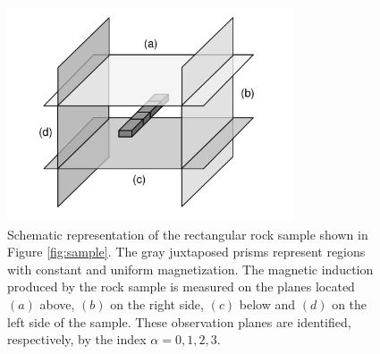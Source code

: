 \documentclass[draft,gc]{agutex}
\begin{document}
 \begin{figure}
 \noindent \includegraphics[width=20pc]{Figs/Fig2_HQ.pdf}
 \caption{Schematic representation of the rectangular rock sample 
 shown in Figure \ref{fig:sample}. The gray juxtaposed prisms represent 
 regions with constant and uniform magnetization. The magnetic induction produced 
 by the rock sample is measured on the planes located $\left(a\right)$ above, 
 $\left(b\right)$ on the right side, $\left(c\right)$ below and 
 $\left(d\right)$ on the left side of the sample. These observation 
 planes are  identified, respectively, by the index 
 $\alpha = 0, 1, 2, 3$.}
 \label{fig:sample-planes}
 \end{figure}
 
\end{document}
